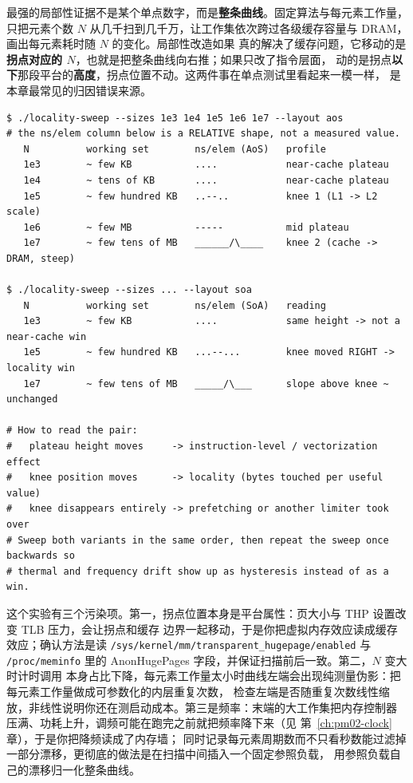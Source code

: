 \documentclass[12pt,a4paper,fontset=fandol]{ctexbook}
\newcommand{\Tp}[1]{\texttt{#1}}
\newcommand{\Bk}{\discretionary{}{}{}}
\newcommand{\Mx}[1]{\textsf{#1}}
\begin{document}
最强的局部性证据不是某个单点数字，而是\textbf{整条曲线}。固定算法与每元素工作量，只把元素个数 $N$
从几千扫到几千万，让工作集依次跨过各级缓存容量与 DRAM，画出每元素耗时随 $N$ 的变化。局部性改造如果
真的解决了缓存问题，它移动的是\textbf{拐点对应的 $N$}，也就是把整条曲线向右推；如果只改了指令层面，
动的是拐点\textbf{以下}那段平台的\textbf{高度}，拐点位置不动。这两件事在单点测试里看起来一模一样，
是本章最常见的归因错误来源。

\begin{lstlisting}[style=outstyle, caption={工作集扫描输出的形态示意（格式示例，非本仓库实测值；形状只用于说明读图方法，数值需读者在自己机器上重做）}, label={lst:pm07-sweep}]
$ ./locality-sweep --sizes 1e3 1e4 1e5 1e6 1e7 --layout aos
# the ns/elem column below is a RELATIVE shape, not a measured value.
   N          working set        ns/elem (AoS)   profile
   1e3        ~ few KB           ....            near-cache plateau
   1e4        ~ tens of KB       ....            near-cache plateau
   1e5        ~ few hundred KB   ..--..          knee 1 (L1 -> L2 scale)
   1e6        ~ few MB           -----           mid plateau
   1e7        ~ few tens of MB   ______/\____    knee 2 (cache -> DRAM, steep)

$ ./locality-sweep --sizes ... --layout soa
   N          working set        ns/elem (SoA)   reading
   1e3        ~ few KB           ....            same height -> not a near-cache win
   1e5        ~ few hundred KB   ...--...        knee moved RIGHT -> locality win
   1e7        ~ few tens of MB   _____/\___      slope above knee ~ unchanged

# How to read the pair:
#   plateau height moves     -> instruction-level / vectorization effect
#   knee position moves      -> locality (bytes touched per useful value)
#   knee disappears entirely -> prefetching or another limiter took over
# Sweep both variants in the same order, then repeat the sweep once backwards so
# thermal and frequency drift show up as hysteresis instead of as a win.
\end{lstlisting}

这个实验有三个污染项。第一，拐点位置本身是平台属性：页大小与 THP 设置改变 TLB 压力，会让拐点和缓存
边界一起移动，于是你把虚拟内存效应读成缓存效应；确认方法是读
\Tp{/sys{\Bk}/kernel{\Bk}/mm{\Bk}/transparent{\Bk}\_hugepage{\Bk}/enabled} 与
\Tp{/proc/{\Bk}meminfo} 里的 \Mx{AnonHugePages} 字段，并保证扫描前后一致。第二，$N$ 变大时计时调用
本身占比下降，每元素工作量太小时曲线左端会出现纯测量伪影：把每元素工作量做成可参数化的内层重复次数，
检查左端是否随重复次数线性缩放，非线性说明你还在测启动成本。第三是频率：末端的大工作集把内存控制器
压满、功耗上升，调频可能在跑完之前就把频率降下来（见 第~\ref{ch:pm02-clock} 章），于是你把降频读成了内存墙；
同时记录每元素周期数而不只看秒数能过滤掉一部分漂移，更彻底的做法是在扫描中间插入一个固定参照负载，
用参照负载自己的漂移归一化整条曲线。
\end{document}
